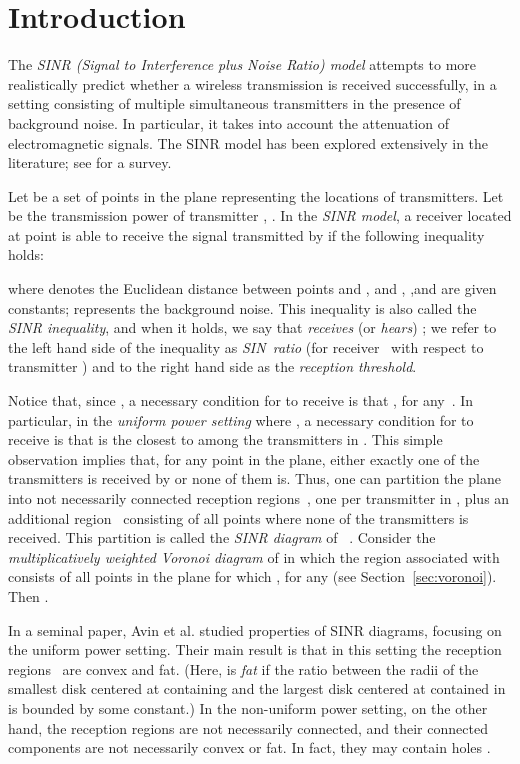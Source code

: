 \documentclass[11pt]{article}
\theoremstyle{remark}
\begin{document}
\thispagestyle{empty}
\newpage
\setcounter{page}{1}

\section{Introduction}


The \emph{SINR (Signal to Interference plus Noise Ratio) model} attempts to more realistically predict whether a wireless transmission is received successfully, in a setting consisting of multiple simultaneous transmitters in the presence of background noise. In particular, it takes into account the attenuation of electromagnetic signals. The SINR model has been explored extensively in the literature; see \cite{lp-saSINRwm-10} for a survey. 

Let  be a set of  points in the plane representing the locations of  transmitters.
Let  be the transmission power of transmitter , . 
In the \emph{SINR model}, a receiver located at point  is able to receive the signal transmitted by  if the following inequality holds:

where  denotes the Euclidean distance between points  and
, and , ,and  are given constants;  represents the background noise.
This inequality is also called the \emph{SINR inequality}, and when it holds, we say that  \emph{receives} (or \emph{hears}) ; we refer to the left hand side of the inequality as \emph{SIN~ratio} (for receiver~ with respect to transmitter ) and to the right hand side as the \emph{reception threshold}.

Notice that, since , a necessary condition for  to receive  is that , for any~. In particular, in the \emph{uniform power setting} where , a necessary condition for  to receive  is that  is the closest to  among the transmitters in . This simple observation implies that, for any point  in the plane, either exactly one of the transmitters is received by  or none of them is. Thus, one can partition the plane into  not necessarily connected reception regions~, one per transmitter in , plus an additional region~ consisting of all points where none of the transmitters is received. This partition is called the \emph{SINR diagram} of~ \cite{aeklpr-sdciawn-12}.
Consider the \emph{multiplicatively weighted Voronoi diagram}  of  in which the region  associated with  consists of all points  in the plane for which , for any  (see Section~\ref{sec:voronoi}).
Then .

In a seminal paper, Avin et  al. \cite{aeklpr-sdciawn-12} studied properties of SINR diagrams, focusing on the uniform power setting. Their main result is that in this setting the reception regions~ are convex and fat. (Here,  is \emph{fat} if the ratio between the radii of the smallest disk centered at  containing  and the largest disk centered at  contained in  is bounded by some constant.) In the non-uniform power setting, on the other hand, the reception regions are not necessarily connected, and their connected components are not necessarily convex or fat.  In fact, they may contain holes \cite{klpp-twn-11}.
\end{document}
